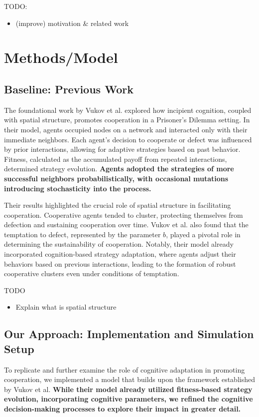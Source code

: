 \documentclass[runningheads]{llncs}
\begin{document}
TODO:
\begin{itemize}
    \item (improve) motivation \& related work
\end{itemize}


\section{Methods/Model}

\subsection{Baseline: Previous Work}

The foundational work by Vukov et al. explored how incipient cognition, coupled with spatial structure, promotes cooperation in a Prisoner’s Dilemma setting. In their model, agents occupied nodes on a network and interacted only with their immediate neighbors. Each agent's decision to cooperate or defect was influenced by prior interactions, allowing for adaptive strategies based on past behavior. Fitness, calculated as the accumulated payoff from repeated interactions, determined strategy evolution. \textbf{Agents adopted the strategies of more successful neighbors probabilistically, with occasional mutations introducing stochasticity into the process.}

Their results highlighted the crucial role of spatial structure in facilitating cooperation. Cooperative agents tended to cluster, protecting themselves from defection and sustaining cooperation over time. Vukov et al. also found that the temptation to defect, represented by the parameter \( b \), played a pivotal role in determining the sustainability of cooperation. Notably, their model already incorporated cognition-based strategy adaptation, where agents adjust their behaviors based on previous interactions, leading to the formation of robust cooperative clusters even under conditions of temptation.


TODO
\begin{itemize}
    \item Explain what is spatial structure
\end{itemize}

\subsection{Our Approach: Implementation and Simulation Setup}

To replicate and further examine the role of cognitive adaptation in promoting cooperation, we implemented a model that builds upon the framework established by Vukov et al. \textbf{While their model already utilized fitness-based strategy evolution, incorporating cognitive parameters, we refined the cognitive decision-making processes to explore their impact in greater detail.}
\end{document}
